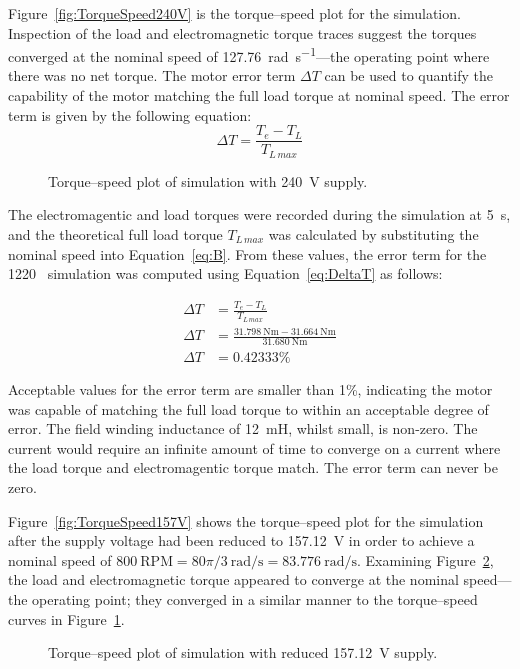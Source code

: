 \documentclass[a4paper,11pt,twocolumn]{article}
\newcommand{\s}{\si{\second}\xspace}
\newcommand{\V}{\si{\volt}\xspace}
\newcommand{\mH}{\si{\milli\henry}\xspace}
\newcommand{\Nm}{\si{\newton\metre}\xspace}
\newcommand{\rps}{\si{\radian\per\second}\xspace}
\newcommand{\RPM}{\text{RPM}\xspace}
\begin{document}
Figure~\vref{fig:TorqueSpeed240V} is the torque--speed plot for the simulation. 
Inspection of the load and electromagnetic torque traces suggest the torques 
converged at the nominal speed of 127.76~\rps---the operating point where there 
was no net torque. The motor error term $\Delta T$ can be used to quantify the 
capability of the motor matching the full load torque at nominal speed. The 
error term is given by the following equation:
\begin{equation} \label{eq:DeltaT}
    \Delta T = \frac{T_e - T_L}{T_{L\,max}}
\end{equation}
\begin{figure}[t]
    \centering
    \def\svgwidth{0.75\textwidth}
    
    \caption{Torque--speed plot of simulation with 240~\V supply.}
    \label{fig:TorqueSpeed240V}
\end{figure}

The electromagentic and load torques were recorded during the simulation at 
5~\s, and the theoretical full load torque $T_{L\,max}$ was calculated by 
substituting the nominal speed into Equation~\ref{eq:B}. From these values, the 
error term for the 1220~\RPM simulation was computed using 
Equation~\ref{eq:DeltaT} as follows:

\begin{align*}
    \Delta T &= \frac{T_e - T_L}{T_{L\,max}} \\
    \Delta T &= \frac{31.798~\Nm - 31.664~\Nm}{31.680~\Nm} \\
    \Delta T &= 0.42333\%
\end{align*}

Acceptable values for the error term are smaller than 1\%, indicating the motor 
was capable of matching the full load torque to within an acceptable degree of 
error. The field winding inductance of 12~\mH, whilst small, is non-zero. The 
current would require an infinite amount of time to converge on a current where 
the load torque and electromagentic torque match. The error term can never be 
zero.

Figure~\vref{fig:TorqueSpeed157V} shows the torque--speed plot for the 
simulation after the supply voltage had been reduced to 157.12~\V in order to 
achieve a nominal speed of $800~\RPM = 80\pi/3~\rps = 83.776~\rps$. Examining 
Figure~\ref{fig:TorqueSpeed157V}, the load and electromagnetic torque appeared 
to converge at the nominal speed---the operating point; they converged in a 
similar manner to the torque--speed curves in Figure~\ref{fig:TorqueSpeed240V}.
\begin{figure}[t]
    \centering
    \def\svgwidth{0.75\textwidth}
    
    \caption{Torque--speed plot of simulation with reduced 157.12~\V supply.}
    \label{fig:TorqueSpeed157V}
\end{figure}
\end{document}
